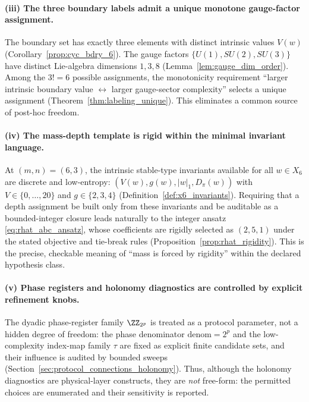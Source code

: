 \paragraph{(iii) The three boundary labels admit a unique monotone gauge-factor assignment.}
The boundary set has exactly three elements with distinct intrinsic values $V(w)$ (Corollary~\ref{prop:cyc_bdry_6}).
The gauge factors $\{U(1),SU(2),SU(3)\}$ have distinct Lie-algebra dimensions $1,3,8$ (Lemma~\ref{lem:gauge_dim_order}).
Among the $3!=6$ possible assignments, the monotonicity requirement ``larger intrinsic boundary value $\leftrightarrow$ larger gauge-sector complexity'' selects a unique assignment (Theorem~\ref{thm:labeling_unique}).
This eliminates a common source of post-hoc freedom.

\paragraph{(iv) The mass-depth template is rigid within the minimal invariant language.}
At $(m,n)=(6,3)$, the intrinsic stable-type invariants available for all $w\in X_6$ are discrete and low-entropy: $(V(w),g(w),|w|_1,D_\pi(w))$ with $V\in\{0,\dots,20\}$ and $g\in\{2,3,4\}$ (Definition~\ref{def:x6_invariants}).
Requiring that a depth assignment be built only from these invariants and be auditable as a bounded-integer closure leads naturally to the integer ansatz \eqref{eq:rhat_abc_ansatz}, whose coefficients are rigidly selected as $(2,5,1)$ under the stated objective and tie-break rules (Proposition~\ref{prop:rhat_rigidity}).
This is the precise, checkable meaning of ``mass is forced by rigidity'' within the declared hypothesis class.

\paragraph{(v) Phase registers and holonomy diagnostics are controlled by explicit refinement knobs.}
The dyadic phase-register family $\ZZ_{2^p}$ is treated as a protocol parameter, not a hidden degree of freedom:
the phase denominator $\mathrm{denom}=2^p$ and the low-complexity index-map family $\tau$ are fixed as explicit finite candidate sets, and their influence is audited by bounded sweeps (Section~\ref{sec:protocol_connections_holonomy}).
Thus, although the holonomy diagnostics are physical-layer constructs, they are \emph{not} free-form: the permitted choices are enumerated and their sensitivity is reported.

